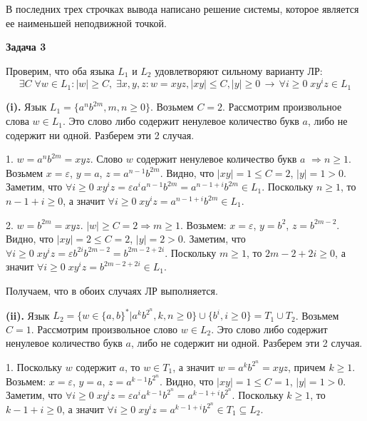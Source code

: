 \documentclass[10pt]{article}
\let \eps \varepsilon
\begin{document}
В последних трех строчках вывода написано решение системы, которое является ее наименьшей неподвижной точкой.

\medskip

{\bf Задача 3}

Проверим, что оба языка $L_1$ и $L_2$ удовлетворяют сильному варианту ЛР:
$$\exists C \; \forall w \in L_1: |w| \geq C, \; \exists x, y, z: w = xyz, |xy| \leq C, |y| \geq 0 \, \rightarrow \, \forall i \geq 0 \; x y^i z \in L_1$$

{\bf (i).}
Язык $L_1 = \{ a^n b^{2m}, m, n \geq 0 \}$. Возьмем $C = 2$. Рассмотрим произвольное слова $w \in L_1$. Это слово либо содержит ненулевое количество букв $a$, либо не содержит ни одной. Разберем эти 2 случая.

1. $w = a^n b^{2m} = xyz$. Слово $w$ содержит ненулевое количество букв $a$ $\Rightarrow n \geq 1$. Возьмем $x = \eps$, $y = a$, $z = a^{n - 1} b^{2m}$. Видно, что $|xy| = 1 \leq C = 2$, $|y| = 1 > 0$. Заметим, что $\forall i \geq 0 \; x y^{i} z = \eps a^{i} a^{n - 1} b^{2m} = a^{n - 1 + i} b^{2m} \in L_1$. Поскольку $n \geq 1$, то $n - 1 + i \geq 0$, а значит $\forall i \geq 0 \; x y^{i} z = a^{n - 1 + i} b^{2m} \in L_1$.

2. $w = b^{2m} = xyz$. $|w| \geq C = 2 \Rightarrow m \geq 1$. Возьмем: $x = \eps$, $y = b^2$, $z = b^{2m - 2}$. Видно, что $|xy| = 2 \leq C = 2$, $|y| = 2 > 0$. Заметим, что $\forall i \geq 0 \; x y^{i} z = \eps b^{2i} b^{2m - 2} = b^{2m - 2 + 2i}$. Поскольку $m \geq 1$, то $2m - 2 + 2i \geq 0$, а значит $\forall i \geq 0 \; x y^{i} z = b^{2m - 2 + 2i} \in L_1$.

Получаем, что в обоих случаях ЛР выполняется.

\smallskip

{\bf (ii).}
Язык $L_2 = \{ w \in \{ a, b \}^* | a^k b^{2^n}, k, n \geq 0 \} \cup \{ b^i, i \geq 0 \} = T_1 \cup T_2$. Возьмем $C = 1$. Рассмотрим произвольное слово $w \in L_2$. Это слово либо содержит ненулевое количество букв $a$, либо не содержит ни одной. Разберем эти 2 случая. 

1. Поскольку $w$ содержит $a$, то $w \in T_1$, а значит $w = a^k b^{2^n} = xyz$, причем $k \geq 1$. Возьмем: $x = \eps$, $y = a$, $z = a^{k - 1} b^{2^n}$. Видно, что $|xy| = 1 \leq C = 1$, $|y| = 1 > 0$. Заметим, что $\forall i \geq 0 \; x y^{i} z = \eps a^i a^{k - 1} b^{2^n} = a^{k - 1 + i} b^{2^n}$. Поскольку $k \geq 1$, то $k - 1 + i \geq 0$, а значит $\forall i \geq 0 \; x y^{i} z = a^{k - 1 + i} b^{2^n} \in T_1 \subseteq L_2$.
\end{document}
